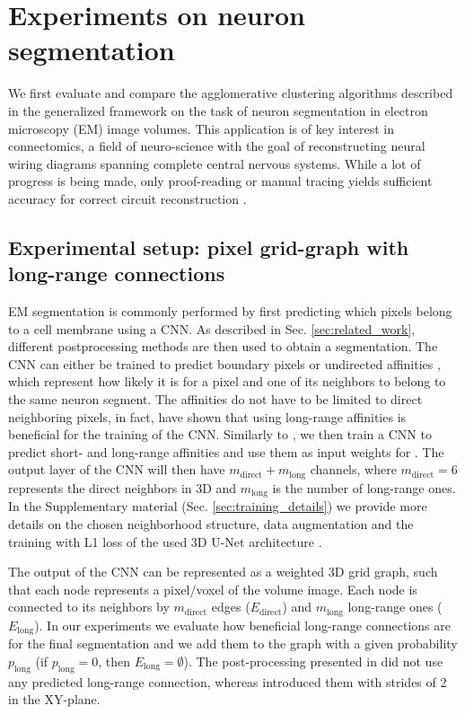 \section{Experiments on neuron segmentation}

We first evaluate and compare the agglomerative clustering algorithms described in the generalized framework on the task of neuron segmentation in electron microscopy (EM) image volumes. This application is of key interest in connectomics, a field of neuro-science with the goal of reconstructing neural wiring diagrams spanning complete central nervous systems. While a lot of progress is being made, only proof-reading or manual tracing yields sufficient accuracy for correct circuit reconstruction \cite{schlegel2017learning}.

\subsection{Experimental setup: pixel grid-graph with long-range connections} \label{sec:grid_graph}
EM segmentation is commonly performed by first predicting which pixels belong to a cell membrane using a CNN. As described in Sec. \ref{sec:related_work}, different postprocessing methods are then used to obtain a segmentation. The CNN can either be trained to predict boundary pixels \cite{beier2017multicut,ciresan2012deep} or undirected affinities \cite{wolf2018mutex,lee2017superhuman,funke2018large}, which represent how likely it is for a pixel and one of its neighbors to belong to the same neuron segment. The affinities do not have to be limited to direct neighboring pixels, in fact, \cite{lee2017superhuman} have shown that using long-range affinities is beneficial for the training of the CNN. Similarly to \cite{wolf2018mutex}, we then train a CNN to predict short- and long-range affinities and use them as input weights for \algname{}. The output layer of the CNN will then have $m_{\mathrm{direct}}+m_{\mathrm{long}}$ channels, where $m_{\mathrm{direct}}=6$ represents the direct neighbors in 3D and $m_{\mathrm{long}}$ is the number of long-range ones. In the Supplementary material (Sec. \ref{sec:training_details}) we provide more details on the chosen neighborhood structure, data augmentation and the training with L1 loss of the used 3D U-Net architecture \cite{ronneberger2015u,cciccek20163d}.

The output of the CNN can be represented as a weighted 3D grid graph, such that each node represents a pixel/voxel of the volume image. Each node is connected to its neighbors by $m_{\mathrm{direct}}$ edges ($E_{\mathrm{direct}}$) and $m_{\mathrm{long}}$ long-range ones ($E_{\mathrm{long}}$).
In our experiments we evaluate how beneficial long-range connections are for the final segmentation and we add them to the graph with a given probability $p_{\mathrm{long}}$ (if $p_{\mathrm{long}}=0$, then $E_{\mathrm{long}}=\emptyset$).
The post-processing presented in \cite{lee2017superhuman} did not use any predicted long-range connection, whereas \cite{wolf2018mutex} introduced them with strides of 2 in the XY-plane.


